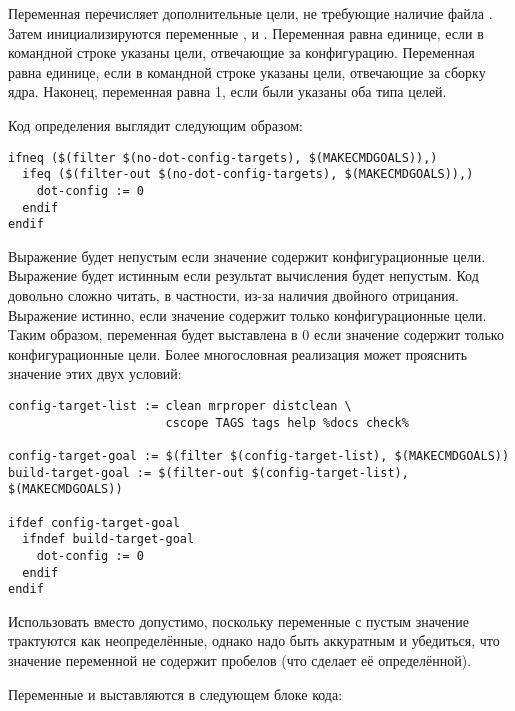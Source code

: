 Переменная  перечисляет дополнительные
цели, не требующие наличие файла . Затем
инициализируются переменные ,
 и . Переменная
 равна единице, если в командной строке
указаны цели, отвечающие за конфигурацию. Переменная
 равна единице, если в командной строке указаны
цели, отвечающие за сборку ядра. Наконец, переменная
 равна 1, если были указаны оба типа целей.

Код определения  выглядит следующим образом:

\begin{verbatim}
ifneq ($(filter $(no-dot-config-targets), $(MAKECMDGOALS)),)
  ifeq ($(filter-out $(no-dot-config-targets), $(MAKECMDGOALS)),)
    dot-config := 0
  endif
endif
\end{verbatim}

Выражение  будет непустым если значение
 содержит конфигурационные цели. Выражение
 будет истинным если результат вычисления
 будет непустым. Код довольно сложно читать, в
частности, из-за наличия двойного отрицания. Выражение
 истинно, если значение 
содержит только конфигурационные цели. Таким образом, переменная
 будет выставлена в 0 если значение
 содержит только конфигурационные цели. Более
многословная реализация может прояснить значение этих двух условий:

\begin{verbatim}
config-target-list := clean mrproper distclean \
                      cscope TAGS tags help %docs check%

config-target-goal := $(filter $(config-target-list), $(MAKECMDGOALS))
build-target-goal := $(filter-out $(config-target-list), $(MAKECMDGOALS))

ifdef config-target-goal
  ifndef build-target-goal
    dot-config := 0
  endif
endif
\end{verbatim}

Использовать  вместо  допустимо,
поскольку переменные с пустым значение трактуются как неопределённые,
однако надо быть аккуратным и убедиться, что значение переменной не
содержит пробелов (что сделает её определённой).

Переменные  и 
выставляются в следующем блоке кода:

